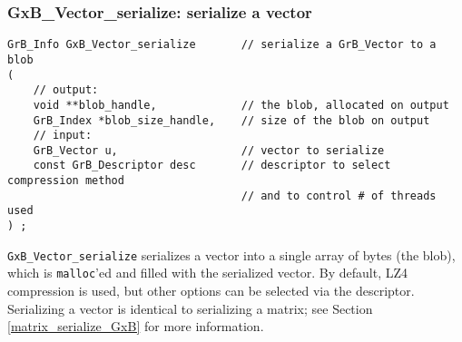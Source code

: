 \documentclass[12pt]{article}
\begin{document}
{%
\subsubsection{{\sf GxB\_Vector\_serialize:}      serialize a vector}
\label{vector_serialize_GxB}

\begin{mdframed}[userdefinedwidth=6in]
{\footnotesize
\begin{verbatim}
GrB_Info GxB_Vector_serialize       // serialize a GrB_Vector to a blob
(
    // output:
    void **blob_handle,             // the blob, allocated on output
    GrB_Index *blob_size_handle,    // size of the blob on output
    // input:
    GrB_Vector u,                   // vector to serialize
    const GrB_Descriptor desc       // descriptor to select compression method
                                    // and to control # of threads used
) ;
\end{verbatim}
} \end{mdframed}

\verb'GxB_Vector_serialize' serializes a vector into a single array of bytes
(the blob), which is \verb'malloc''ed and filled with the serialized vector.
By default, LZ4 compression is used, but other options can be selected
via the descriptor.
Serializing a vector is identical to serializing a matrix;
see Section \ref{matrix_serialize_GxB} for more information.

\newpage

% 

}
\end{document}
